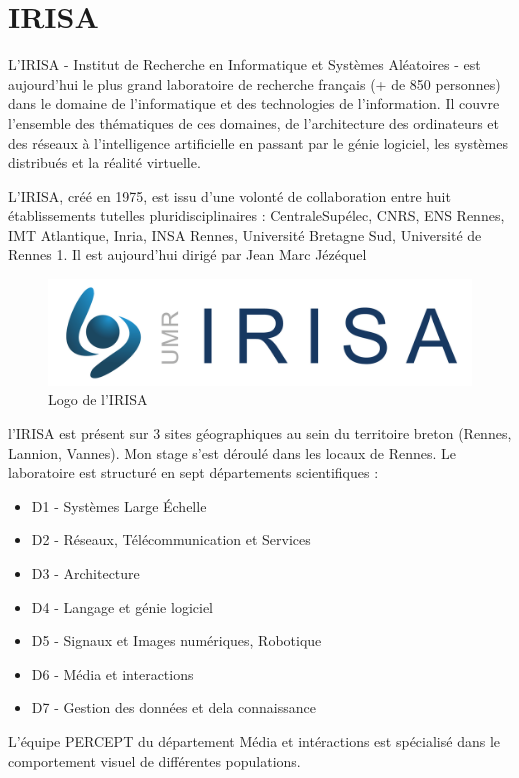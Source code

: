 \chapter{IRISA}

\par
L'IRISA - Institut de Recherche en Informatique et Systèmes Aléatoires - est
aujourd'hui le plus grand laboratoire de recherche français (+ de 850 personnes)
dans le domaine de l'informatique et des technologies de l'information. Il
couvre l'ensemble des thématiques de ces domaines, de l'architecture des
ordinateurs et des réseaux à l'intelligence artificielle en passant par le génie
logiciel, les systèmes distribués et la réalité virtuelle.

\par
L'IRISA, créé en 1975, est issu d'une volonté de collaboration entre huit établissements tutelles pluridisciplinaires : CentraleSupélec, CNRS, ENS Rennes, IMT Atlantique, Inria, INSA Rennes, Université Bretagne Sud, Université de Rennes 1. Il est aujourd'hui dirigé par Jean Marc Jézéquel

\begin{figure}[h]
    \centering
    \includegraphics[width=0.7\linewidth]{datas/logo_irisa.jpg}
    \caption{Logo de l'IRISA}
\end{figure}

\par
l'IRISA est présent sur 3 sites géographiques au sein du territoire breton (Rennes, Lannion, Vannes). Mon stage s'est déroulé dans les locaux de Rennes.
Le laboratoire est structuré en sept départements scientifiques :
\begin{itemize}
    \item D1 - Systèmes Large Échelle
    \item D2 - Réseaux, Télécommunication et Services
    \item D3 - Architecture
    \item D4 - Langage et génie logiciel
    \item D5 - Signaux et Images numériques, Robotique
    \item D6 - Média et interactions
    \item D7 - Gestion des données et dela connaissance
\end{itemize}


\par
L'équipe PERCEPT du département Média et intéractions est spécialisé dans le comportement visuel de différentes populations.